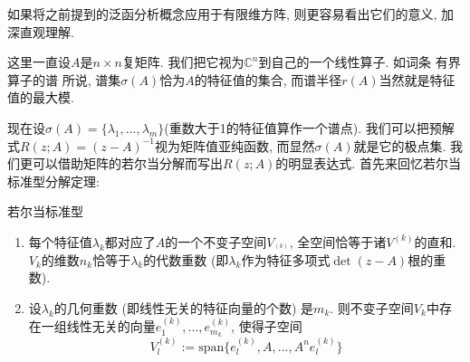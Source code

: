 

如果将之前提到的泛函分析概念应用于有限维方阵, 则更容易看出它们的意义, 加深直观理解. 

这里一直设$A$是$n\times n$复矩阵. 我们把它视为$\mathbb{C}^n$到自己的一个线性算子. 如词条 有界算子的谱 所说, 谱集$\sigma(A)$恰为$A$的特征值的集合, 而谱半径$r(A)$当然就是特征值的最大模. 

现在设$\sigma(A)=\{\lambda_1,...,\lambda_m\}$(重数大于1的特征值算作一个谱点). 我们可以把预解式$R(z;A)=(z-A)^{-1}$视为矩阵值亚纯函数, 而显然$\sigma(A)$就是它的极点集. 我们更可以借助矩阵的若尔当分解而写出$R(z;A)$的明显表达式. 首先来回忆若尔当标准型分解定理:

\begin{theorem}{若尔当标准型}
\begin{enumerate}
\item 每个特征值$\lambda_k$都对应了$A$的一个不变子空间$V_^{(k)}$, 全空间恰等于诸$V^{(k)}$的直和. $V_k$的维数$n_k$恰等于$\lambda_k$的代数重数 (即$\lambda_k$作为特征多项式$\det(z-A)$根的重数).
\item 设$\lambda_k$的几何重数 (即线性无关的特征向量的个数) 是$m_k$. 则不变子空间$V_k$中存在一组线性无关的向量$e^{(k)}_1,...,e^{(k)}_{m_k}$, 使得子空间
$$
V_l^{(k)}:=\text{span}\{e^{(k)}_{l},A,...,A^ne^{(k)}_{l}\}
$$
\end{enumerate}
\end{theorem}